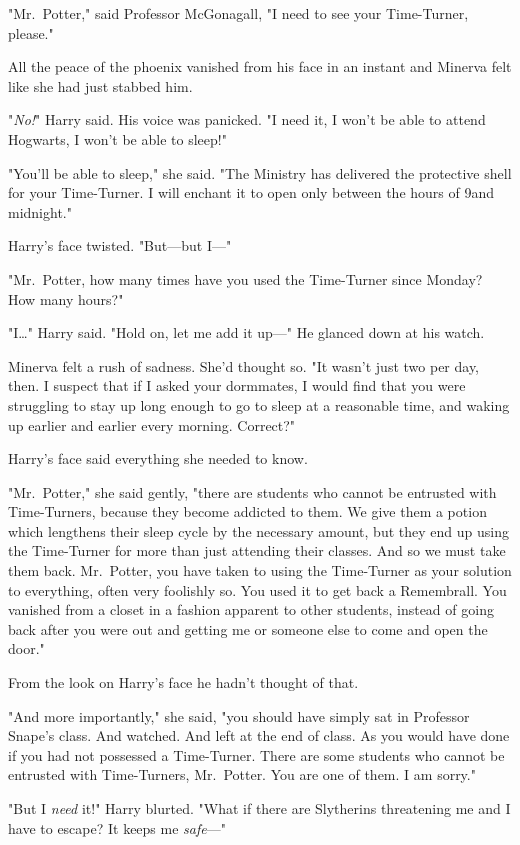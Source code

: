 "Mr.~Potter," said Professor McGonagall, "I need to see your Time-Turner, 
please."

All the peace of the phoenix vanished from his face in an instant and Minerva 
felt like she had just stabbed him.

"\emph{No!}" Harry said. His voice was panicked. "I need it, I won't be able to 
attend Hogwarts, I won't be able to sleep!"

"You'll be able to sleep," she said. "The Ministry has delivered the protective 
shell for your Time-Turner. I will enchant it to open only between the hours of 
9\PM and midnight."

Harry's face twisted. "But---but I---"

"Mr.~Potter, how many times have you used the Time-Turner since Monday? How 
many hours?"

"I{\ldots}" Harry said. "Hold on, let me add it up---" He glanced down at his 
watch.

Minerva felt a rush of sadness. She'd thought so. "It wasn't just two per day, 
then. I suspect that if I asked your dormmates, I would find that you were 
struggling to stay up long enough to go to sleep at a reasonable time, and 
waking up earlier and earlier every morning. Correct?"

Harry's face said everything she needed to know.

"Mr.~Potter," she said gently, "there are students who cannot be entrusted with 
Time-Turners, because they become addicted to them. We give them a potion which 
lengthens their sleep cycle by the necessary amount, but they end up using the 
Time-Turner for more than just attending their classes. And so we must take 
them back. Mr.~Potter, you have taken to using the Time-Turner as your solution 
to everything, often very foolishly so. You used it to get back a Remembrall. 
You vanished from a closet in a fashion apparent to other students, instead of 
going back after you were out and getting me or someone else to come and open 
the door."

From the look on Harry's face he hadn't thought of that.

"And more importantly," she said, "you should have simply sat in Professor 
Snape's class. And watched. And left at the end of class. As you would have 
done if you had not possessed a Time-Turner. There are some students who cannot 
be entrusted with Time-Turners, Mr.~Potter. You are one of them. I am sorry."

"But I \emph{need} it!" Harry blurted. "What if there are Slytherins 
threatening me and I have to escape? It keeps me \emph{safe}---"

